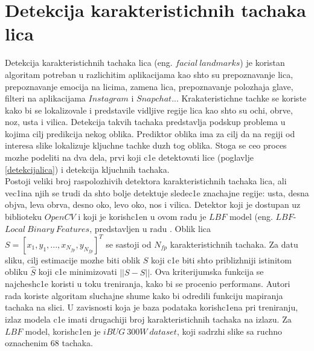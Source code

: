 \documentclass[a4paper, openany, oneside, 11pt]{book}
\begin{document}
\section{Detekcija karakteristichnih tachaka lica}
Detekcija karakteristichnih tachaka lica (eng. $facial\ landmarks$) je koristan algoritam potreban u razlichitim aplikacijama kao shto su prepoznavanje lica, prepoznavanje emocija na licima, zamena lica, prepoznavanje polozhaja glave, filteri na aplikacijama $Instagram$ i $Snapchat$... Krakateristichne tachke se koriste kako bi se lokalizovale i predstavile vidljive regije lica kao shto su ochi, obrve, noz, usta i vilica. Detekcija takvih tachaka predstavlja podskup problema u kojima cilj predikcija nekog oblika. Prediktor oblika ima za cilj da na regiji od interesa slike lokalizuje kljuchne tachke duzh tog oblika. Stoga se ceo proces mozhe podeliti na dva dela, prvi koji c1e detektovati lice (poglavlje \ref{detekcijalica}) i detekcija kljuchnih tachaka.\\
Postoji veliki broj raspolozhivih detektora karakteristichnih tachaka lica, ali vec1ina njih se trudi da shto bolje detektuje sledec1e znachajne regije: usta, desna objva, leva obrva, desno oko, levo oko, nos i vilica. Detektor koji je dostupan uz biblioteku $OpenCV$ i koji je korish\-c1en u ovom radu je $LBF$ model (eng. $LBF$-$Local\ Binary\ Features$, predstavljen u radu \cite{LBF}. Oblik lica $S=[x_1, y_1,...,x_{N_{fp}},y_{N_{fp}}]^T$ se sastoji od $N_{fp}$ karakteristichnih tachaka. Za datu sliku, cilj estimacije mozhe biti oblik $S$ koji c1e biti shto priblizhniji istinitom obliku $\hat{S}$ koji c1e minimizovati $||S-\hat{S}||$. Ova kriterijumska funkcija se najchesh\-c1e koristi u toku treniranja, kako bi se procenio performans. Autori rada \cite{LBF} koriste algoritam sluchajne shume kako bi odredili funkciju mapiranja tachaka na slici.
U zavisnosti koja je baza podataka korishc1ena pri treniranju, izlaz modela c1e imati drugachiji broj karakteristichnih tachaka na izlazu. Za $LBF$ model, korish\-c1en je $iBUG\ 300W\ dataset$, koji sadrzhi slike sa ruchno oznachenim 68 tachaka.
\end{document}
